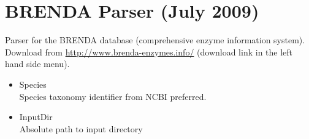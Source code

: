 \section{BRENDA Parser (July 2009)}
Parser for the BRENDA database (comprehensive enzyme information system). 
Download from \url{http://www.brenda-enzymes.info/} (download link in the left hand side menu).
\begin{itemize}
  \item{Species}\\
  Species taxonomy identifier from NCBI preferred.
  \item{InputDir}\\
  Absolute path to input directory
\end{itemize}
    
    
